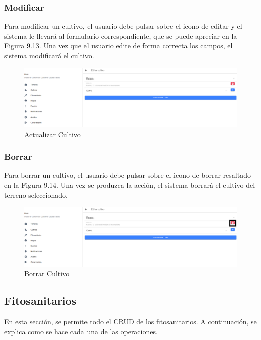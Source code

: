 \subsubsection{Modificar}
Para modificar un cultivo, el usuario debe pulsar sobre el icono de editar y el sistema le llevará al formulario correspondiente, que se puede apreciar en la Figura 9.13. Una vez que el usuario edite de forma correcta los campos, el sistema modificará el cultivo.
\begin{figure}[H]
    \centering
    \includegraphics[width=0.7\linewidth]{images/user-manual/crop/update.png}
    \caption{Actualizar Cultivo}
\end{figure}

\subsubsection{Borrar}
Para borrar un cultivo, el usuario debe pulsar sobre el icono de borrar resaltado en la Figura 9.14. Una vez se produzca la acción, el sistema borrará el cultivo del terreno seleccionado.
\begin{figure}[H]
    \centering
    \includegraphics[width=0.7\linewidth]{images/user-manual/crop/delete.png}
    \caption{Borrar Cultivo}
\end{figure}

\subsection{Fitosanitarios}
En esta sección, se permite todo el CRUD de los fitosanitarios. A continuación, se explica como se hace cada una de las operaciones.

